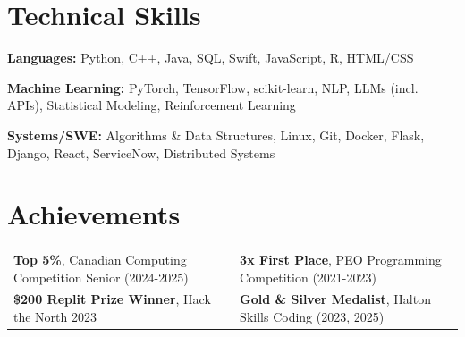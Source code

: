 \documentclass[11pt,letterpaper]{article}
\begin{document}

\section*{Technical Skills}

\small

\textbf{Languages:}
Python, C++, Java, SQL, Swift, JavaScript, R, HTML/CSS

\vspace{0.18em}

\textbf{Machine Learning:}
PyTorch, TensorFlow, scikit-learn, NLP, LLMs (incl. APIs), Statistical Modeling, Reinforcement Learning

\vspace{0.18em}

\textbf{Systems/SWE:}
Algorithms \& Data Structures, Linux, Git, Docker, Flask, Django, React, ServiceNow, Distributed Systems


\section*{Achievements}

\begin{tabularx}{\textwidth}{@{}X X@{}}

\small \textbf{Top 5\%}, Canadian Computing Competition Senior (2024-2025)
&
\small \textbf{3x First Place}, PEO Programming Competition (2021-2023)

\\[0.2em]

\small \textbf{\$200 Replit Prize Winner}, Hack the North 2023
&
\small \textbf{Gold \& Silver Medalist}, Halton Skills Coding (2023, 2025)

\end{tabularx}
\end{document}
